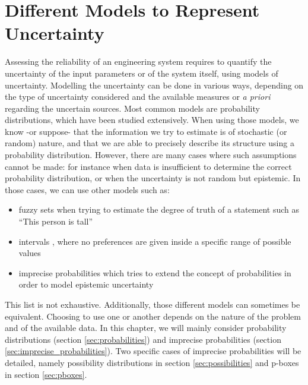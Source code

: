 \section{Different Models to Represent Uncertainty}\label{sec:different_models_of_uncertainty}
Assessing the reliability of an engineering system requires to quantify the uncertainty of the input parameters or of the system itself, using models of uncertainty. Modelling the uncertainty can be done in various ways, depending on the type of uncertainty considered and the available measures or \textit{a priori} regarding the uncertain sources. Most common models are probability distributions, which have been studied extensively. When using those models, we know -or suppose- that the information we try to estimate is of stochastic (or random) nature, and that we are able to precisely describe its structure using a probability distribution. However, there are many cases where such assumptions cannot be made: for instance when data is insufficient to determine the correct probability distribution, or when the uncertainty is not random but epistemic. In those cases, we can use other models such as:
\begin{itemize}
    \item fuzzy sets \cite{zadeh_fuzzy_1999} when trying to estimate the degree of truth of a statement such as ``This person is tall''
    \item intervals \cite{jaulin_applied_2001}, where no preferences are given inside a specific range of possible values
    \item imprecise probabilities which tries to extend the concept of probabilities in order to model epistemic uncertainty
\end{itemize}
This list is not exhaustive. Additionally, those different models can sometimes be equivalent. Choosing to use one or another depends on the nature of the problem and of the available data. In this chapter, we will mainly consider probability distributions (section \ref{sec:probabilities}) and imprecise probabilities (section \ref{sec:imprecise_probabilities}). Two specific cases of imprecise probabilities will be detailed, namely possibility distributions in section \ref{sec:possibilities} and p-boxes in section \ref{sec:pboxes}.


